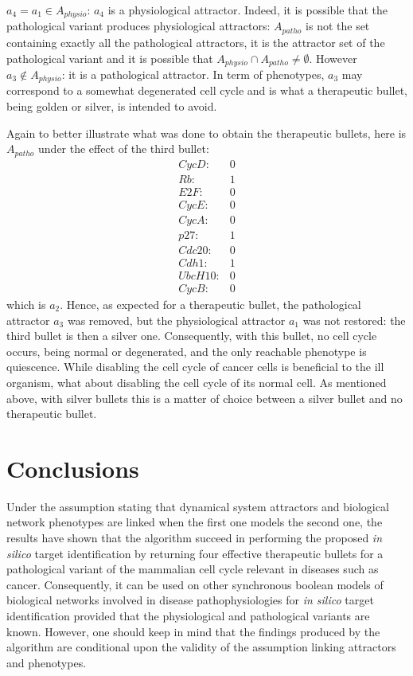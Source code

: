 \documentclass[oneside,a4paper,onecolumn,notitlepage]{article}
\begin{document}
$a_{4}=a_{1}\in A_{physio}$: $a_{4}$ is a physiological attractor. Indeed, it is possible that the pathological variant produces physiological attractors: $A_{patho}$ is not the set containing exactly all the pathological attractors, it is the attractor set of the pathological variant and it is possible that $A_{physio}\cap A_{patho}\neq \emptyset$. However $a_3\notin A_{physio}$: it is a pathological attractor. In term of phenotypes, $a_3$ may correspond to a somewhat degenerated cell cycle and is what a therapeutic bullet, being golden or silver, is intended to avoid.

Again to better illustrate what was done to obtain the therapeutic bullets, here is $A_{patho}$ under the effect of the third bullet:
\begin{equation*}
\begin{matrix}
CycD:&0\\
Rb:&1\\
E2F:&0\\
CycE:&0\\
CycA:&0\\
p27:&1\\
Cdc20:&0\\
Cdh1:&1\\
UbcH10:&0\\
CycB:&0
\end{matrix}
\end{equation*}
which is $a_{2}$. Hence, as expected for a therapeutic bullet, the pathological attractor $a_{3}$ was removed, but the physiological attractor $a_{1}$ was not restored: the third bullet is then a silver one. Consequently, with this bullet, no cell cycle occurs, being normal or degenerated, and the only reachable phenotype is quiescence. While disabling the cell cycle of cancer cells is beneficial to the ill organism, what about disabling the cell cycle of its normal cell. As mentioned above, with silver bullets this is a matter of choice between a silver bullet and no therapeutic bullet.

\section{Conclusions}
Under the assumption stating that dynamical system attractors and biological network phenotypes are linked when the first one models the second one, the results have shown that the algorithm succeed in performing the proposed \textit{in silico} target identification by returning four effective therapeutic bullets for a pathological variant of the mammalian cell cycle relevant in diseases such as cancer. Consequently, it can be used on other synchronous boolean models of biological networks involved in disease pathophysiologies for \textit{in silico} target identification provided that the physiological and pathological variants are known. However, one should keep in mind that the findings produced by the algorithm are conditional upon the validity of the assumption linking attractors and phenotypes.
\end{document}

